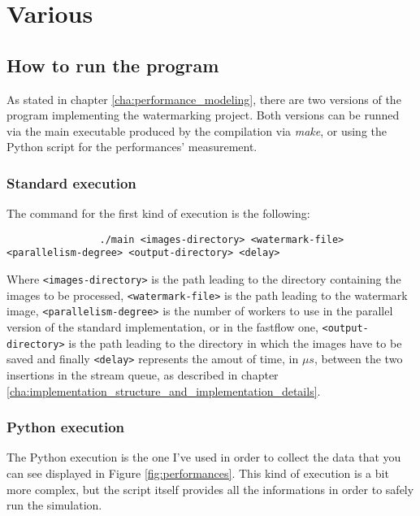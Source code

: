 \chapter{Various} %
\label{cha:various}
    \section{How to run the program} %
    \label{sec:how_to_run_the_program}
        As stated in chapter \ref{cha:performance_modeling}, there are two versions of the program implementing
        the watermarking project. Both versions can be runned via the main executable produced by the compilation
        via \textit{make}, or using the Python script for the performances' measurement.
        \subsection{Standard execution} %
        \label{sub:standard_execution}
            The command for the first kind of execution is the following:

            \begin{verbatim}
                ./main <images-directory> <watermark-file> <parallelism-degree> <output-directory> <delay>
            \end{verbatim}

            Where \texttt{<images-directory>} is the path leading to the directory containing the images to be
            processed, \texttt{<watermark-file>} is the path leading to the watermark image,
            \texttt{<parallelism-degree>} is the number of workers to use in the parallel version of the standard
            implementation, or in the fastflow one, \texttt{<output-directory>} is the path leading to the
            directory in which the images have to be saved and finally \texttt{<delay>} represents the amout of
            time, in $\mu s$, between the two insertions in the stream queue, as described in chapter
            \ref{cha:implementation_structure_and_implementation_details}.
        \subsection{Python execution} %
        \label{sub:python_execution}
            The Python execution is the one I've used in order to collect the data that you can see displayed in
            Figure \ref{fig:performances}. This kind of execution is a bit more complex, but the script itself
            provides all the informations in order to safely run the simulation.

